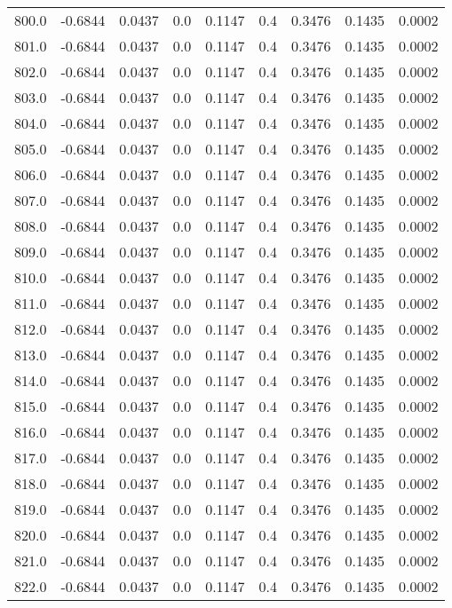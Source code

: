 \begin{longtable}{lrrrrrrrr}
800.0 & -0.6844 & 0.0437 & 0.0 & 0.1147 & 0.4 & 0.3476 & 0.1435 & 0.0002 \\
801.0 & -0.6844 & 0.0437 & 0.0 & 0.1147 & 0.4 & 0.3476 & 0.1435 & 0.0002 \\
802.0 & -0.6844 & 0.0437 & 0.0 & 0.1147 & 0.4 & 0.3476 & 0.1435 & 0.0002 \\
803.0 & -0.6844 & 0.0437 & 0.0 & 0.1147 & 0.4 & 0.3476 & 0.1435 & 0.0002 \\
804.0 & -0.6844 & 0.0437 & 0.0 & 0.1147 & 0.4 & 0.3476 & 0.1435 & 0.0002 \\
805.0 & -0.6844 & 0.0437 & 0.0 & 0.1147 & 0.4 & 0.3476 & 0.1435 & 0.0002 \\
806.0 & -0.6844 & 0.0437 & 0.0 & 0.1147 & 0.4 & 0.3476 & 0.1435 & 0.0002 \\
807.0 & -0.6844 & 0.0437 & 0.0 & 0.1147 & 0.4 & 0.3476 & 0.1435 & 0.0002 \\
808.0 & -0.6844 & 0.0437 & 0.0 & 0.1147 & 0.4 & 0.3476 & 0.1435 & 0.0002 \\
809.0 & -0.6844 & 0.0437 & 0.0 & 0.1147 & 0.4 & 0.3476 & 0.1435 & 0.0002 \\
810.0 & -0.6844 & 0.0437 & 0.0 & 0.1147 & 0.4 & 0.3476 & 0.1435 & 0.0002 \\
811.0 & -0.6844 & 0.0437 & 0.0 & 0.1147 & 0.4 & 0.3476 & 0.1435 & 0.0002 \\
812.0 & -0.6844 & 0.0437 & 0.0 & 0.1147 & 0.4 & 0.3476 & 0.1435 & 0.0002 \\
813.0 & -0.6844 & 0.0437 & 0.0 & 0.1147 & 0.4 & 0.3476 & 0.1435 & 0.0002 \\
814.0 & -0.6844 & 0.0437 & 0.0 & 0.1147 & 0.4 & 0.3476 & 0.1435 & 0.0002 \\
815.0 & -0.6844 & 0.0437 & 0.0 & 0.1147 & 0.4 & 0.3476 & 0.1435 & 0.0002 \\
816.0 & -0.6844 & 0.0437 & 0.0 & 0.1147 & 0.4 & 0.3476 & 0.1435 & 0.0002 \\
817.0 & -0.6844 & 0.0437 & 0.0 & 0.1147 & 0.4 & 0.3476 & 0.1435 & 0.0002 \\
818.0 & -0.6844 & 0.0437 & 0.0 & 0.1147 & 0.4 & 0.3476 & 0.1435 & 0.0002 \\
819.0 & -0.6844 & 0.0437 & 0.0 & 0.1147 & 0.4 & 0.3476 & 0.1435 & 0.0002 \\
820.0 & -0.6844 & 0.0437 & 0.0 & 0.1147 & 0.4 & 0.3476 & 0.1435 & 0.0002 \\
821.0 & -0.6844 & 0.0437 & 0.0 & 0.1147 & 0.4 & 0.3476 & 0.1435 & 0.0002 \\
822.0 & -0.6844 & 0.0437 & 0.0 & 0.1147 & 0.4 & 0.3476 & 0.1435 & 0.0002 \\

\end{longtable}
